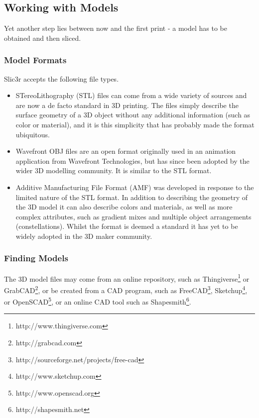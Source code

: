 \subsection{Working with Models}
\label{sub:working_with_models}

Yet another step lies between now and the first print - a model has to be obtained and then sliced.

\subsubsection{Model Formats} %
\label{sub:model_formats}

Slic3r accepts the following file types.

\begin{itemize}
	\item STereoLithography (STL) files can come from a wide variety of sources and are now a de facto standard in 3D printing.  The files simply describe the surface geometry of a 3D object without any additional information (such as color or material), and it is this simplicity that has probably made the format ubiquitous.
	\item Wavefront OBJ files are an open format originally used in an animation application from Wavefront Technologies, but has since been adopted by the wider 3D modelling community.  It is similar to the STL format.
	\item Additive Manufacturing File Format (AMF) was developed in response to the limited nature of the STL format.  In addition to describing the geometry of the 3D model it can also describe colors and materials, as well as more complex attributes, such as gradient mixes and multiple object arrangements (constellations).  Whilst the format is deemed a standard it has yet to be widely adopted in the 3D maker community.
\end{itemize}

\subsubsection{Finding Models} %
\label{sub:finding_models}

The 3D model files may come from an online repository, such as Thingiverse\footnote{http://www.thingiverse.com} or GrabCAD\footnote{http://grabcad.com}, or be created from a CAD program, such as FreeCAD\footnote{http://sourceforge.net/projects/free-cad}, Sketchup\footnote{http://www.sketchup.com}, or OpenSCAD\footnote{http://www.openscad.org}, or an online CAD tool such as Shapesmith\footnote{http://shapesmith.net}.

